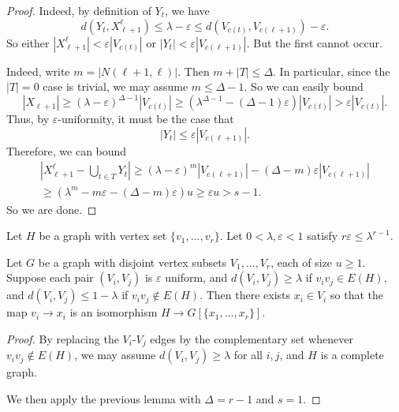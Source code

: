 \documentclass[a4paper]{article}
\begin{document}
\begin{proof}
  Indeed, by definition of $Y_t$, we have
  \[
    d(Y_t, X_{\ell + 1}^\ell) \leq \lambda - \varepsilon \leq d(V_{c(t)}, V_{c(\ell + 1)}) - \varepsilon.
  \]
  So either $|X_{\ell + 1}^\ell| < \varepsilon |V_{c(t)}|$ or $|Y_t| < \varepsilon |V_{c(\ell + 1)}|$. But the first cannot occur.

  Indeed, write $m = |N(\ell + 1, \ell)|$. Then $m + |T| \leq \Delta$. In particular, since the $|T| = 0$ case is trivial, we may assume $m \leq \Delta - 1$. So we can easily bound
  \[
    |X_{\ell + 1}| \geq (\lambda - \varepsilon)^{\Delta - 1} |V_{c(t)}| \geq (\lambda^{\Delta - 1} - (\Delta - 1)\varepsilon) |V_{c(t)}| > \varepsilon |V_{c(t)}|.
  \]
  Thus, by $\varepsilon$-uniformity, it must be the case that
  \[
    |Y_t| \leq \varepsilon |V_{c(\ell + 1)}|.
  \]
  Therefore, we can bound
  \begin{multline*}
    \left|X_{\ell + 1}^{\ell} - \bigcup_{t \in T} Y_t \right| \geq (\lambda - \varepsilon)^m |V_{c(\ell + 1)}| - (\Delta - m) \varepsilon|V_{c(\ell + 1)}|\\
    \geq (\lambda^m - m\varepsilon - (\Delta - m)\varepsilon) u \geq \varepsilon u > s - 1.
  \end{multline*}
  So we are done.

%
\end{proof}

\begin{cor}
  Let $H$ be a graph with vertex set $\{v_1, \ldots, v_r\}$. Let $0 < \lambda, \varepsilon < 1$ satisfy $r \varepsilon \leq \lambda^{r - 1}$.

  Let $G$ be a graph with disjoint vertex subsets $V_1, \ldots, V_r$, each of size $u \geq 1$. Suppose each pair $(V_i, V_j)$ is $\varepsilon$ uniform, and $d(V_i, V_j) \geq \lambda$ if $v_i v_j \in E(H)$, and $d(V_i, V_j) \leq 1 - \lambda$ if $v_i v_j \not \in E(H)$. Then there exists $x_i \in V_i$ so that the map $v_i \to x_i$ is an isomorphism $H \to G[\{x_1, \ldots, x_r\}]$.
\end{cor}

\begin{proof}
  By replacing the $V_i$-$V_j$ edges by the complementary set whenever $v_i v_j \not \in E(H)$, we may assume $d(V_i, V_j) \geq \lambda$ for all $i, j$, and $H$ is a complete graph.

  We then apply the previous lemma with $\Delta = r - 1$ and $s = 1$.
\end{proof}
\end{document}
